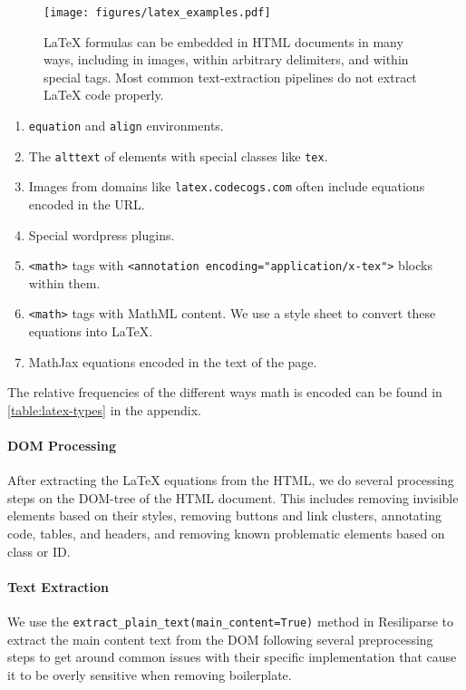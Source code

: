 \begin{figure}[t!]
\begin{center}
\texttt{[image: figures/latex\_examples.pdf]}
\end{center}
\vspace{-1.2em}
\caption{\LaTeX{} formulas can be embedded in HTML documents in many ways, including in images, within arbitrary delimiters, and within special tags. Most common text-extraction pipelines do not extract \LaTeX{} code properly.}
\end{figure}

\begin{enumerate}
    \item \texttt{equation} and \texttt{align} environments.
    \item The \texttt{alttext} of elements with special classes like \texttt{tex}.
    \item Images from domains like \texttt{latex.codecogs.com} often include equations encoded in the URL.
    \item Special wordpress plugins.
    \item \texttt{<math>} tags with \texttt{<annotation encoding="application/x-tex">} blocks within them.
    \item \texttt{<math>} tags with MathML content. We use a style sheet to convert these equations into \LaTeX{}.
    \item MathJax equations encoded in the text of the page.
\end{enumerate}

The relative frequencies of the different ways math is encoded can be found in \autoref{table:latex-types} in the appendix.

\paragraph{DOM Processing} After extracting the \LaTeX{} equations from the HTML, we do several processing steps on the DOM-tree of the HTML document. This includes removing invisible elements based on their styles, removing buttons and link clusters, annotating code, tables, and headers, and removing known problematic elements based on class or ID.

\paragraph{Text Extraction} We use the \texttt{extract\_plain\_text(main\_content=True)} method in Resiliparse \citep{bevendorff:2018} to extract the main content text from the DOM following several preprocessing steps to get around common issues with their specific implementation that cause it to be overly sensitive when removing boilerplate.

